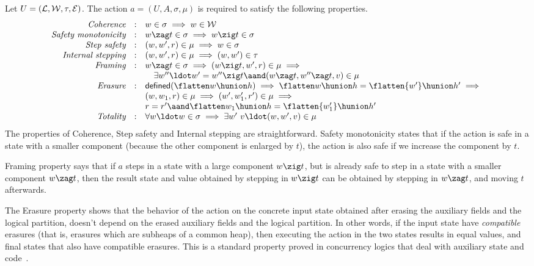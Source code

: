 Let $U = ({\cal L}, {\cal W}, \tau, {\cal E})$. The action $a = (U, A,
\sigma, \mu)$ is required to satisfy the following properties.
{\small
\[
\begin{array}{rcl}
\textit{Coherence} & : & w \in \sigma \implies w \in {\cal W}\\
\textit{Safety monotonicity} & : & w \zag t \in \sigma \implies w \zig t \in \sigma\\
\textit{Step safety} & : & (w, w', r) \in \mu \implies w \in \sigma\\
\textit{Internal stepping} & : & (w, w', r) \in \mu \implies (w, w') \in \tau\\
\textit{Framing} & : & w \zag t \in \sigma \implies (w \zig t, w', r) \in \mu \implies \hbox{}\\
& & \quad \exists w''\ldot w' = w'' \zig t \aand  (w \zag t, w'' \zag t, v) \in \mu\\
\textit{Erasure} & : &  \mathsf{defined} (\flatten w \hunion h) \implies \flatten w \hunion h = \flatten{w'} \hunion h' \implies \hbox{}\\
& &  (w, w_1, r) \in \mu \implies (w', w'_1, r') \in \mu \implies \hbox{}\\
& &  r = r' \aand \flatten w_1 \hunion h = \flatten{w'_1} \hunion h'\\
\textit{Totality} & : & \forall w\ldot w \in \sigma \implies \exists w'\ v\ldot (w, w', v) \in \mu
\end{array}
\]}
The properties of Coherence, Step safety and Internal stepping are
straightforward.  
%
Safety monotonicity states that if the action is safe in a state with
a smaller \self component (because the other component is enlarged by
$t$), the action is also safe if we increase the \self component by
$t$.
%

Framing property says that if $a$ steps in a state with a large \self
component $w \zig t$, but is already safe to step in a state with a
smaller \self component $w \zag t$, then the result state and value
obtained by stepping in $w \zig t$ can be obtained by stepping in $w
\zag t$, and moving $t$ afterwards.

The Erasure property shows that the behavior of the action on the
concrete input state obtained after erasing the auxiliary fields and
the logical partition, doesn't depend on the erased auxiliary fields
and the logical partition. In other words, if the input state have
\emph{compatible} erasures (that is, erasures which are subheaps of a
common heap), then executing the action in the two states results in
equal values, and final states that also have compatible
erasures. This is a standard property proved in concurrency logics
that deal with auxiliary state and
code~\cite{Owicki-Gries:CACM76,Brookes:TCS07}.

